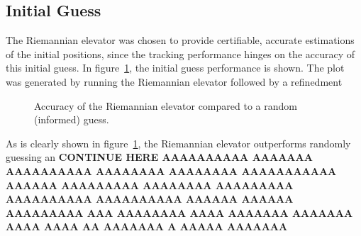 \subsection{Initial Guess}
The Riemannian elevator was chosen to provide certifiable, accurate estimations of the initial positions, since the tracking performance hinges on the accuracy of this initial guess. In figure~\ref{fig:accuracy-comp}, the initial guess performance is shown. The plot was generated by running the Riemannian elevator followed by a refinedment 
\begin{figure}
    \centering
    
    \caption{Accuracy of the Riemannian elevator compared to a random (informed) guess.}
    \label{fig:accuracy-comp}
\end{figure}
As is clearly shown in figure~\ref{fig:accuracy-comp}, the Riemannian elevator outperforms randomly guessing an \textbf{CONTINUE HERE AAAAAAAAAA AAAAAAA AAAAAAAAAA AAAAAAAA AAAAAAAA AAAAAAAAAAA AAAAAA AAAAAAAAA AAAAAAAA AAAAAAAAA AAAAAAAAAA AAAAAAAAAA AAAAAA AAAAAA AAAAAAAAA AAA AAAAAAAA AAAA AAAAAAA AAAAAAA AAAA AAAA AA AAAAAAA A AAAAA AAAAAAA}